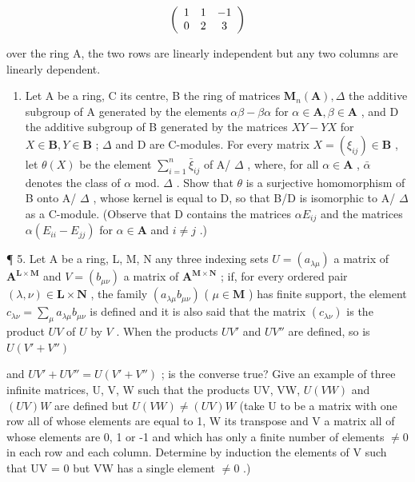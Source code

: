 \[
\left( \begin{array}{c c c} 1 & 1 & - 1 \\ 0 & 2 & 3 \end{array} \right)
\]

over the ring A, the two rows are linearly independent but any two columns are linearly dependent.

\begin{enumerate}
\def\labelenumi{\arabic{enumi}.}
\setcounter{enumi}{3}
\tightlist
\item
  Let A be a ring, C its centre, B the ring of matrices \(\mathbf{M}_n(\mathbf{A}), \Delta\) the additive subgroup of A generated by the elements \(\alpha\beta - \beta\alpha\) for \(\alpha \in \mathbf{A}, \beta \in \mathbf{A}\) , and D the additive subgroup of B generated by the matrices \(XY - YX\) for \(X \in \mathbf{B}, Y \in \mathbf{B}\) ; \(\Delta\) and D are C-modules. For every matrix \(X = (\xi_{ij}) \in \mathbf{B}\) , let \(\theta(X)\) be the element \(\sum_{i=1}^{n} \bar{\xi}_{ij}\) of A/ \(\Delta\) , where, for all \(\alpha \in \mathbf{A}\) , \(\bar{\alpha}\) denotes the class of \(\alpha\) mod. \(\Delta\) . Show that \(\theta\) is a surjective homomorphism of B onto A/ \(\Delta\) , whose kernel is equal to D, so that B/D is isomorphic to A/ \(\Delta\) as a C-module. (Observe that D contains the matrices \(\alpha E_{ij}\) and the matrices \(\alpha(E_{ii} - E_{jj})\) for \(\alpha \in \mathbf{A}\) and \(i \neq j\) .)
\end{enumerate}

¶ 5. Let A be a ring, L, M, N any three indexing sets \(U = (a_{\lambda \mu})\) a matrix of \(\mathbf{A}^{\mathbf{L} \times \mathbf{M}}\) and \(V = (b_{\mu \nu})\) a matrix of \(\mathbf{A}^{\mathbf{M} \times \mathbf{N}}\) ; if, for every ordered pair \((\lambda, \nu) \in \mathbf{L} \times \mathbf{N}\) , the family \((a_{\lambda \mu} b_{\mu \nu})\) ( \(\mu \in \mathbf{M}\) ) has finite support, the element \(c_{\lambda \nu} = \sum_{\mu} a_{\lambda \mu} b_{\mu \nu}\) is defined and it is also said that the matrix \((c_{\lambda \nu})\) is the product \(UV\) of \(U\) by \(V\) . When the products \(UV'\) and \(UV''\) are defined, so is \(U(V' + V'')\)

and \(UV' + UV'' = U(V' + V'')\) ; is the converse true? Give an example of three infinite matrices, U, V, W such that the products UV, VW, \(U(VW)\) and \((UV)W\) are defined but \(U(VW) \neq (UV)W\) (take U to be a matrix with one row all of whose elements are equal to 1, W its transpose and V a matrix all of whose elements are 0, 1 or -1 and which has only a finite number of elements \(\neq 0\) in each row and each column. Determine by induction the elements of V such that UV = 0 but VW has a single element \(\neq 0\) .)

